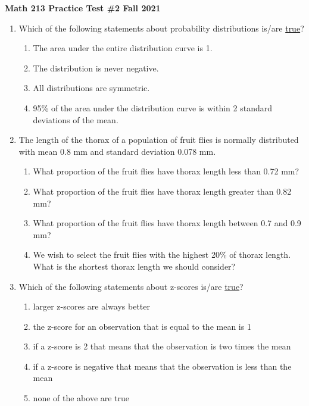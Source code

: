 \documentclass[12pt,fullpage]{amsart}
\begin{document}
\textbf{Math 213 \quad\ddag\quad Practice Test \#2 \quad\ddag\quad Fall 2021}

\hrulefill
\medskip
\begin{enumerate}

\item Which of the following statements about probability distributions is/are \underline{true}?
  \begin{enumerate}
  \item The area under the entire distribution curve is 1.
  \item The distribution is never negative.
  \item All distributions are symmetric.
  \item 95\% of the area under the distribution curve is within 2 standard deviations of the mean.
  \end{enumerate}

\vfill

\item The length of the thorax of a population of fruit flies is
  normally distributed with mean 0.8 mm and standard deviation 0.078
  mm.
  \begin{enumerate}
  \item What proportion of the fruit flies have thorax length less
    than 0.72 mm?
  \item What proportion of the fruit flies have thorax length greater
    than 0.82 mm?
  \item What proportion of the fruit flies have thorax length between
    0.7 and 0.9 mm?
  \item We wish to select the fruit flies with the highest 20\% of
    thorax length.  What is the shortest thorax length we should
    consider?
  \end{enumerate}

  \vfill
 
  
\item Which of the following statements about z-scores is/are \underline{true}?
\begin{enumerate}
\item	larger z-scores are always better
\item	the z-score for an observation that is equal to the mean is 1
\item	if a z-score is 2 that means that the observation is two times the mean
\item	if a z-score is negative that means that the observation is less than the mean
\item   none of the above are true
\end{enumerate}



\end{enumerate}
\end{document}
